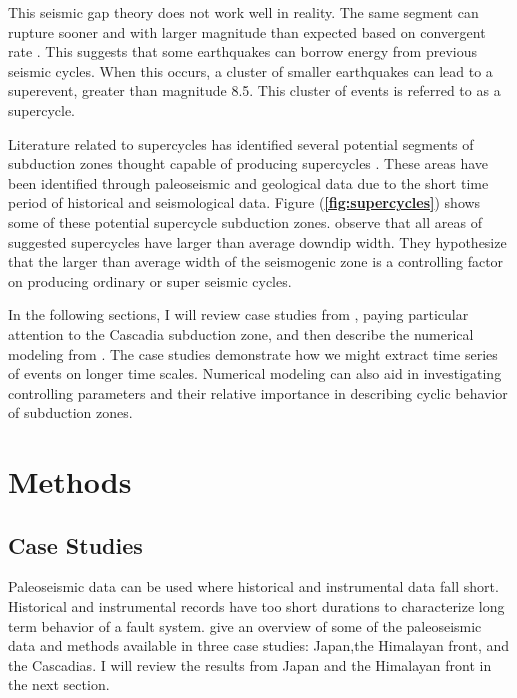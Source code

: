 \documentclass[]{proposalnsf}
\begin{document}
This seismic gap theory does not work well in reality. The same segment can rupture sooner and with larger magnitude than expected based on convergent rate \citep{Nocquet2016}. This suggests that some earthquakes can borrow energy from previous seismic cycles. When this occurs, a cluster of smaller earthquakes can lead to a superevent, greater than magnitude 8.5. This cluster of events is referred to as a supercycle. 

Literature related to supercycles has identified several potential segments of subduction zones thought capable of producing supercycles \citep{Goldfinger2013, Herrendorfer2015, Nocquet2016}. These areas have been identified through paleoseismic and geological data due to the short time period of historical and seismological data. Figure ({\bf \ref{fig:supercycles}}) shows some of these potential supercycle subduction zones. \citet{Herrendorfer2015} observe that all areas of suggested supercycles have larger than average downdip width. They hypothesize that the larger than average width of the seismogenic zone is a controlling factor on producing ordinary or super seismic cycles. 

In the following sections, I will review case studies from \citet{Goldfinger2013}, paying particular attention to the Cascadia subduction zone, and then describe the numerical modeling from \citet{Herrendorfer2015}. The case studies demonstrate how we might extract time series of events on longer time scales. Numerical modeling can also aid in investigating controlling parameters and their relative importance in describing cyclic behavior of subduction zones.


\section{Methods}

\subsection{Case Studies}

Paleoseismic data can be used where historical and instrumental data fall short. Historical and instrumental records have too short durations to characterize long term behavior of a fault system. \citet{Goldfinger2013} give an overview of some of the paleoseismic data and methods available in three case studies: Japan,the Himalayan front, and the Cascadias. I will review the results from Japan and the Himalayan front in the next section.
\end{document}
